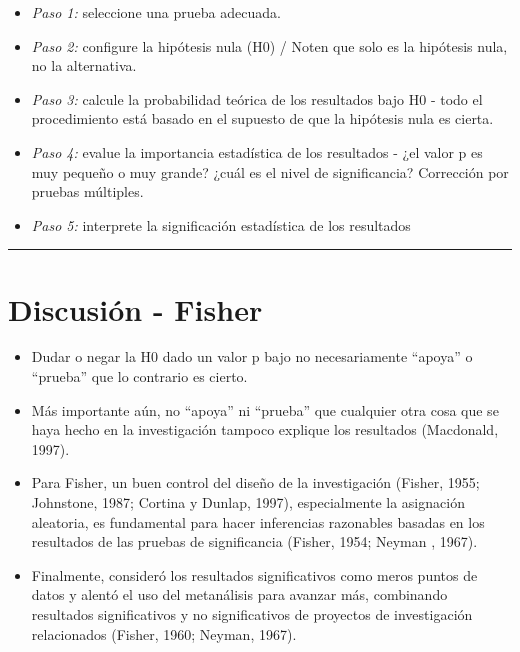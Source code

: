 \documentclass[
]{article}
\begin{document}
\begin{itemize}
\item
  \emph{Paso 1:} seleccione una prueba adecuada.
\item
  \emph{Paso 2:} configure la hipótesis nula (H0) / Noten que solo es la
  hipótesis nula, no la alternativa.
\item
  \emph{Paso 3:} calcule la probabilidad teórica de los resultados bajo
  H0 - todo el procedimiento está basado en el supuesto de que la
  hipótesis nula es cierta.
\item
  \emph{Paso 4:} evalue la importancia estadística de los resultados -
  ¿el valor p es muy pequeño o muy grande? ¿cuál es el nivel de
  significancia? Corrección por pruebas múltiples.
\item
  \emph{Paso 5:} interprete la significación estadística de los
  resultados
\end{itemize}

\begin{center}\rule{0.5\linewidth}{0.5pt}\end{center}

\hypertarget{discusiuxf3n---fisher}{%
\section{Discusión - Fisher}\label{discusiuxf3n---fisher}}

\begin{itemize}
\item
  Dudar o negar la H0 dado un valor p bajo no necesariamente ``apoya'' o
  ``prueba'' que lo contrario es cierto.
\item
  Más importante aún, no ``apoya'' ni ``prueba'' que cualquier otra cosa
  que se haya hecho en la investigación tampoco explique los resultados
  (Macdonald, 1997).
\item
  Para Fisher, un buen control del diseño de la investigación (Fisher,
  1955; Johnstone, 1987; Cortina y Dunlap, 1997), especialmente la
  asignación aleatoria, es fundamental para hacer inferencias razonables
  basadas en los resultados de las pruebas de significancia (Fisher,
  1954; Neyman , 1967).
\item
  Finalmente, consideró los resultados significativos como meros puntos
  de datos y alentó el uso del metanálisis para avanzar más, combinando
  resultados significativos y no significativos de proyectos de
  investigación relacionados (Fisher, 1960; Neyman, 1967).
\end{itemize}
\end{document}
